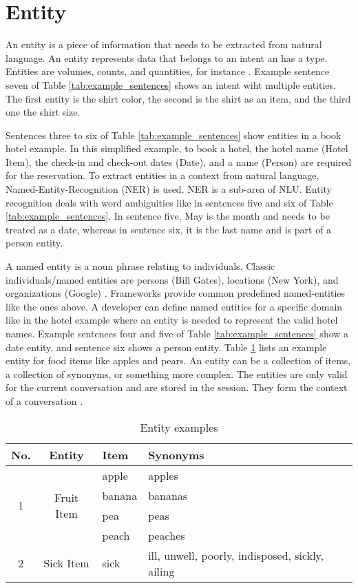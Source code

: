\section{Entity} \label{sec:entity}
An entity is a piece of information that needs to be extracted from natural language.
An entity represents data that belongs to an intent an has a type.
Entities are volumes, counts, and quantities, for instance \cite{buiildChatbotsPython}.
Example sentence seven of Table \ref{tab:example_sentences} shows an intent wiht multiple entities.
The first entity is the shirt color,  the second is the shirt as an item, and the third one the shirt size.

Sentences three to six of Table \ref{tab:example_sentences} show entities in a book hotel example.
In this simplified example, to book a hotel, the hotel name (Hotel Item), the check-in and check-out dates (Date), and a name (Person) are required for the reservation.
To extract entities in a context from natural language, Named-Entity-Recognition (NER) is used.
NER is a sub-area of NLU.
Entity recognition deals with word ambiguities like in sentences five and six of Table \ref{tab:example_sentences}.
In sentence five, May is the month and needs to be treated as a date, whereas in sentence six, it is the last name and is part of a person entity.

A named entity is a noun phrase relating to individuals.
Classic individuals/named entities are persons (Bill Gates), locations (New York), and organizations (Google) \cite{geyer2016named}.
Frameworks provide common predefined named-entities like the ones above.
A developer can define named entities for a specific domain like in the hotel example where an entity is needed to represent the valid hotel names.
Example sentences four and five of Table \ref{tab:example_sentences} show a date entity, and sentence six shows a person entity.
Table \ref{tab:entityexampledialog} lists an example entity for food items like apples and pears.
An entity can be a collection of items, a collection of synonyms, or something more complex.
The entities are only valid for the current conversation and are stored in the session. 
They form the context of a conversation \cite{singhbuilding}.

\begin{table}[H]
    \centering
    \begin{tabular}{ c | c | l | l }
  No. & Entity & Item & Synonyms \\ \hline \hline
  \multirow{4}{*}{1} & \multirow{4}{*}{Fruit Item} & apple & apples \\
       & & banana & bananas\\
       & & pea & peas \\ 
       & & peach & peaches \\ \hline
    2 & Sick Item & sick & ill, unwell, poorly, indisposed, sickly, ailing \\
    \hline
\end{tabular}
    \caption{Entity examples} \label{tab:entityexampledialog}
\end{table} \noindent


